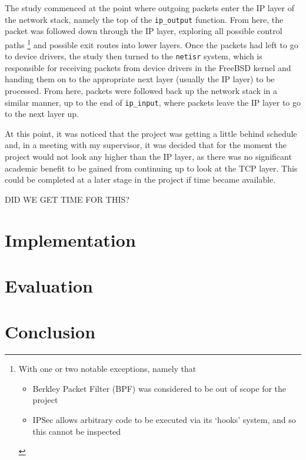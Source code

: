 \documentclass[a4paper,12pt,twoside,openright]{report}
\begin{document}
	The study commenced at the point where outgoing packets enter the IP layer of the network stack, namely the top of the \verb|ip_output| function. From here, the packet was followed down through the IP layer, exploring all possible control paths
	\footnote{
		With one or two notable exceptions, namely that
		\begin{itemize}
			\item Berkley Packet Filter (BPF) was considered to be out of scope for the project
			\item IPSec allows arbitrary code to be executed via its `hooks' system, and so this cannot be inspected
		\end{itemize}
	}
	and possible exit routes into lower layers. Once the packets had left to go to device drivers, the study then turned to the \texttt{netisr} system, which is responsible for receiving packets from device drivers in the FreeBSD kernel and handing them on to the appropriate next layer (usually the IP layer) to be processed. From here, packets were followed back up the network stack in a similar manner, up to the end of \verb|ip_input|, where packets leave the IP layer to go to the next layer up.
	
	At this point, it was noticed that the project was getting a little behind schedule and, in a meeting with my supervisor, it was decided that for the moment the project would not look any higher than the IP layer, as there was no significant academic benefit to be gained from continuing up to look at the TCP layer. This could be completed at a later stage in the project if time became available.
	
	DID WE GET TIME FOR THIS?
	
	
	\chapter{Implementation}
	
	
	\chapter{Evaluation}
	
	
	\chapter{Conclusion}
	
	
	
	
	
	
	\appendix
	
	
	
	
	
	
\end{document}
